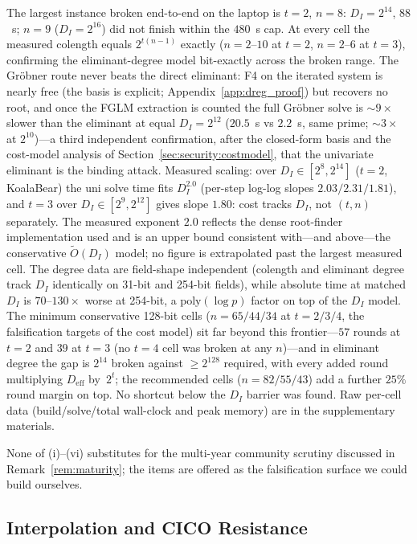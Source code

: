 \documentclass[11pt,a4paper]{article}
\theoremstyle{definition}
\begin{document}
\noindent
The largest instance broken end-to-end on the laptop is $t=2$,
$n=8$: $D_I = 2^{14}$, $88$~s; $n = 9$ ($D_I = 2^{16}$) did not
finish within the $480$~s cap. At every cell the measured colength
equals $2^{t(n-1)}$ exactly ($n = 2$--$10$ at $t=2$, $n = 2$--$6$ at
$t=3$), confirming the eliminant-degree model bit-exactly across the
broken range. The Gr\"obner route never beats the direct eliminant:
F4 on the iterated system is nearly free (the basis is explicit;
Appendix~\ref{app:dreg_proof}) but recovers no root, and once the
FGLM extraction is counted the full Gr\"obner solve is ${\sim}9\times$
slower than the eliminant at equal $D_I = 2^{12}$ ($20.5$~s vs
$2.2$~s, same prime; ${\sim}3\times$ at $2^{10}$)---a third
independent confirmation, after the closed-form basis and the
cost-model analysis of Section~\ref{sec:security:costmodel}, that
the univariate eliminant is the binding attack. Measured scaling:
over $D_I \in [2^{8}, 2^{14}]$ ($t=2$, KoalaBear) the \textsf{uni}
solve time fits $D_I^{2.0}$ (per-step log-log slopes
$2.03/2.31/1.81$), and $t=3$ over $D_I \in [2^{9}, 2^{12}]$ gives
slope $1.80$: cost tracks $D_I$, not $(t, n)$ separately. The
measured exponent $2.0$ reflects the dense root-finder
implementation used and is an upper bound consistent with---and
above---the conservative $\widetilde{O}(D_I)$ model; no figure is
extrapolated past the largest measured cell. The degree data are
field-shape independent (colength and eliminant degree track $D_I$
identically on 31-bit and 254-bit fields), while absolute time at
matched $D_I$ is $70$--$130\times$ worse at 254-bit, a
$\mathrm{poly}(\log p)$ factor on top of the $D_I$ model. The
minimum conservative 128-bit cells ($n = 65/44/34$ at
$t = 2/3/4$, the falsification targets of the cost model) sit far
beyond this frontier---$57$ rounds at $t=2$ and
$39$ at $t=3$ (no $t=4$ cell was broken at any $n$)---and in
eliminant degree the gap is $2^{14}$ broken against $\ge 2^{128}$
required, with every added round multiplying $D_{\mathrm{eff}}$
by~$2^{t}$; the recommended cells ($n = 82/55/43$) add a further
$25\%$ round margin on top. No shortcut below the $D_I$ barrier was found. Raw
per-cell data (build/solve/total wall-clock and peak memory) are in
the supplementary materials.

\medskip
\noindent
None of (i)--(vi) substitutes for the multi-year community scrutiny
discussed in Remark~\ref{rem:maturity}; the items are offered as the
falsification surface we could build ourselves.


\subsection{Interpolation and CICO Resistance}\label{sec:security:interpolation}
\end{document}
